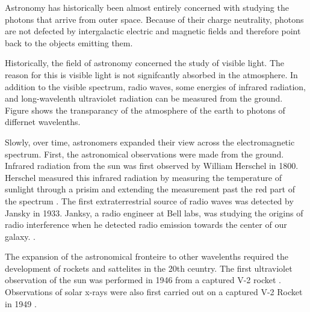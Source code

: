 Astronomy has historically been almost entirely concerned with studying
the photons that arrive from outer space.  Because of their charge
neutrality, photons are not defected by intergalactic electric and
magnetic fields and therefore point back to the objects 
emitting them. 

Historically, the field of astronomy concerned
the study of visible light. The reason for this is visible light
is not signifcantly absorbed in the atmosphere. 
In addition to the visible spectrum, radio waves, some
energies of infrared radiation, and long-wavelenth ultraviolet
radiation can be measured from the ground. Figure
 shows the transparancy
of the atmosphere of the earth to photons of differnet wavelenths.

Slowly, over time, astronomers expanded their view across the
electromagnetic spectrum.  First, the astronomical observations
were made from the ground.  Infrared radiation from the sun was
first observed by William Herschel in 1800. Herschel measured this
infrared radiation by measuring the temperature of sunlight through
a prisim and extending the measurement past the red part of the
spectrum \citep{herschel_1800_experiments-refrangibility}.  The first
extraterrestrial source of radio waves was detected by Jansky in 1933.
Janksy, a radio engineer at Bell labs, was studying the
origins of radio interference when he detected radio emission towards
the center of our galaxy.
\citep{jansky_1933_electrical-disturbances}.

The expansion of the astronomical fronteire to other wavelenths required
the development of rockets and sattelites in the 20th ceuntry.  The first
ultraviolet observation of the sun was performed in 1946 from a captured
V-2 rocket \citep{baum_1946_ultraviolet-spectrum}.  Observations of
solar x-rays were also first carried out on a captured V-2 Rocket in
1949 \citep{burnight_1949_x-radiation-atmosphere}.
